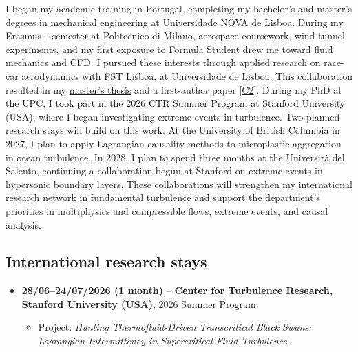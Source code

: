 \documentclass[11pt]{article}
\begin{document}
I began my academic training in Portugal, completing my bachelor's and master's degrees in mechanical engineering at Universidade NOVA de Lisboa. During my Erasmus+ semester at Politecnico di Milano, aerospace coursework, wind-tunnel experiments, and my first exposure to Formula Student drew me toward fluid mechanics and CFD. I pursued these interests through applied research on race-car aerodynamics with FST Lisboa, at Universidade de Lisboa. This collaboration resulted in my \href{http://hdl.handle.net/10362/149236}{master's thesis}
and a first-author paper [\hyperlink{pub-C2}{C2}].
During my PhD at the UPC, I took part in the 2026 CTR Summer Program at Stanford University (USA), where I began investigating extreme events in turbulence. Two planned research stays will build on this work. At the University of British Columbia in 2027, I plan to apply Lagrangian causality methods to microplastic aggregation in ocean turbulence. In 2028, I plan to spend three months at the Universit\`a del Salento, continuing a collaboration begun at Stanford on extreme events in hypersonic boundary layers. These collaborations will strengthen my international research network in fundamental turbulence and support the department's priorities in multiphysics and compressible flows, extreme events, and causal analysis.

\subsection{International research stays}\label{sec:stays}
\begin{itemize}
  \item \textbf{28/06--24/07/2026 (1 month)} -- \textbf{Center for Turbulence
  Research, Stanford University (USA)}, 2026 Summer Program. 
  \begin{itemize}
    \item Project: \emph{Hunting Thermofluid-Driven Transcritical Black Swans:
    Lagrangian Intermittency in Supercritical Fluid Turbulence}.
  \end{itemize}
\end{itemize}
\end{document}
